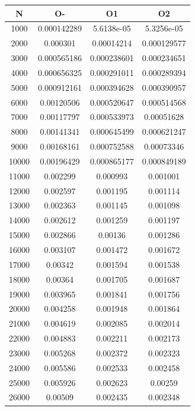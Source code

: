 \begin{center}
\begin{tabular}{| c | c | c | c |}
\hline
\textbf{N} & \textbf{O-} & \textbf{O1} & \textbf{O2} \\ \hline
1000 & 0.000142289 & 5.6138e-05 & 5.3256e-05 \\ \hline
2000 & 0.000301 & 0.00014214 & 0.000129577 \\ \hline
3000 & 0.000565186 & 0.000238601 & 0.000234651 \\ \hline
4000 & 0.000656325 & 0.000291011 & 0.000289394 \\ \hline
5000 & 0.000912161 & 0.000394628 & 0.000390957 \\ \hline
6000 & 0.00120506 & 0.000520647 & 0.000514568 \\ \hline
7000 & 0.00117797 & 0.000533973 & 0.00051628 \\ \hline
8000 & 0.00141341 & 0.000645499 & 0.000621247 \\ \hline
9000 & 0.00168161 & 0.000752588 & 0.00073346 \\ \hline
10000 & 0.00196429 & 0.000865177 & 0.000849189 \\ \hline
11000 & 0.002299 & 0.000993 & 0.001001 \\ \hline
12000 & 0.002597 & 0.001195 & 0.001114 \\ \hline
13000 & 0.002363 & 0.001145 & 0.001098 \\ \hline
14000 & 0.002612 & 0.001259 & 0.001197 \\ \hline
15000 & 0.002866 & 0.00136 & 0.001286 \\ \hline
16000 & 0.003107 & 0.001472 & 0.001672 \\ \hline
17000 & 0.00342 & 0.001594 & 0.001538 \\ \hline
18000 & 0.00364 & 0.001705 & 0.001687 \\ \hline
19000 & 0.003965 & 0.001841 & 0.001756 \\ \hline
20000 & 0.004258 & 0.001948 & 0.001864 \\ \hline
21000 & 0.004619 & 0.002085 & 0.002014 \\ \hline
22000 & 0.004883 & 0.002211 & 0.002173 \\ \hline
23000 & 0.005268 & 0.002372 & 0.002323 \\ \hline
24000 & 0.005586 & 0.002533 & 0.002458 \\ \hline
25000 & 0.005926 & 0.002623 & 0.00259 \\ \hline
26000 & 0.00509 & 0.002435 & 0.002348 \\ \hline

\end{tabular}
\end{center}
